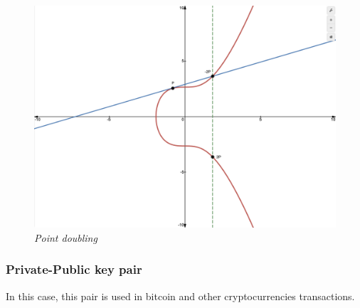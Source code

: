 \documentclass{article}
\newcommand\tab[1][1cm]{\hspace*{#1}}
\begin{document}
\begin{figure}[H]
    \begin{center}
        \includegraphics[width=0.6 \textwidth]{images/point_doubling.png}
        \caption{\textit{Point doubling}}
    \end{center}
\end{figure}

\vspace{5mm} %


\subsubsection{Private-Public key pair}

\tab In this case, this pair is used in bitcoin and other cryptocurrencies transactions.

\nocite{*}
\printbibliography
\end{document}
